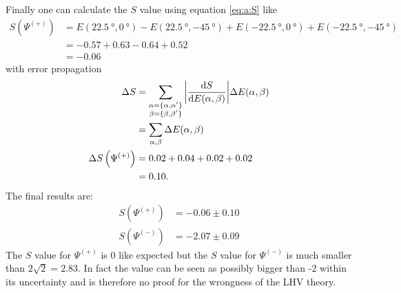 Finally one can calculate the $S$ value using equation \eqref{eq:a:S} like
\begin{align*}
S\left(\Psi^{(+)}\right)
    &=E\left(\SI{22.5}{\degree},\SI{0}{\degree}\right)-E\left(\SI{22.5}{\degree},\SI{-45}{\degree}\right)+E\left(\SI{-22.5}{\degree},\SI{0}{\degree}\right)+E\left(\SI{-22.5}{\degree},\SI{-45}{\degree}\right)
    \\
    &=-0.57+0.63-0.64+0.52
    \\
    &=-0.06
\end{align*}
with error propagation
\begin{subequations}
\label{eq:a:dS}
\begin{align}
\Delta S
    &= \sum_{\substack{\alpha=\lbrace\alpha,\alpha'\rbrace\\\beta=\lbrace\beta,\beta'\rbrace}}\abs{\frac{\dd S}{\dd E(\alpha,\beta)}}\Delta E(\alpha,\beta)
    \label{eq:a:dS:1}\\
    &=\sum_{\alpha,\beta}\Delta E(\alpha,\beta)
    \label{eq:a:dS:2}\\
\Delta S\left(\Psi^{(+)}\right)
    &=0.02+0.04+0.02+0.02
    \nonumber\\
    &=0.10.
    \nonumber
\end{align}
\end{subequations}
The final results are:
\begin{align*}
S\left(\Psi^{(+)}\right)
    &=-0.06\pm 0.10
    \\
S\left(\Psi^{(-)}\right)
    &=-2.07\pm 0.09
\end{align*}
The $S$ value for $\Psi^{(+)}$ is 0 like expected but the $S$ value for $\Psi^{(-)}$ is much smaller than $2\sqrt{2}=2.83$.
In fact the value can be seen as possibly bigger than -2 within its uncertainty and is therefore no proof for the wrongness of the LHV theory.

